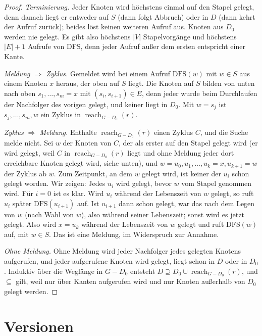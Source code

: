 \documentclass[a4paper,12pt,twoside]{report}
\DeclareRobustCommand{\_}{\ifmmode\mbox{\textunderscore}\else\textunderscore\allowbreak{}\fi}
\theoremstyle{definition}
\begin{document}
\begin{proof}
	\emph{Terminierung.} Jeder Knoten wird höchstens einmal auf den Stapel gelegt, denn danach liegt er entweder auf $S$ (dann folgt Abbruch) oder in $D$ (dann kehrt der Aufruf zurück); beides löst keinen weiteren Aufruf aus. Knoten aus $D_0$ werden nie gelegt. Es gibt also höchstens $|V|$ Stapelvorgänge und höchstens $|E|+1$ Aufrufe von DFS, denn jeder Aufruf außer dem ersten entspricht einer Kante.
 
	\emph{Meldung $\Rightarrow$ Zyklus.} Gemeldet wird bei einem Aufruf $\mathrm{DFS}(w)$ mit $w\in S$ aus einem Knoten $x$ heraus, der oben auf $S$ liegt. Die Knoten auf $S$ bilden von unten nach oben $s_1,\ldots,s_m=x$ mit $(s_i,s_{i+1})\in E$, denn jeder wurde beim Durchlaufen der Nachfolger des vorigen gelegt, und keiner liegt in $D_0$. Mit $w=s_j$ ist $s_j,\ldots,s_m,w$ ein Zyklus in $\operatorname{reach}_{G-D_0}(r)$.
 
	\emph{Zyklus $\Rightarrow$ Meldung.} Enthalte $\operatorname{reach}_{G-D_0}(r)$ einen Zyklus $C$, und die Suche melde nicht. Sei $w$ der Knoten von $C$, der als erster auf den Stapel gelegt wird (er wird gelegt, weil $C$ in $\operatorname{reach}_{G-D_0}(r)$ liegt und ohne Meldung jeder dort erreichbare Knoten gelegt wird, siehe unten), und $w=u_0,u_1,\ldots,u_k=x,u_{k+1}=w$ der Zyklus ab $w$. Zum Zeitpunkt, an dem $w$ gelegt wird, ist keiner der $u_i$ schon gelegt worden. Wir zeigen: Jedes $u_i$ wird gelegt, bevor $w$ vom Stapel genommen wird. Für $i=0$ ist es klar. Wird $u_i$ während der Lebenszeit von $w$ gelegt, so ruft $u_i$ später $\mathrm{DFS}(u_{i+1})$ auf. Ist $u_{i+1}$ dann schon gelegt, war das nach dem Legen von $w$ (nach Wahl von $w$), also während seiner Lebenszeit; sonst wird es jetzt gelegt. Also wird $x=u_k$ während der Lebenszeit von $w$ gelegt und ruft $\mathrm{DFS}(w)$ auf, mit $w\in S$. Das ist eine Meldung, im Widerspruch zur Annahme.
 
	\emph{Ohne Meldung.} Ohne Meldung wird jeder Nachfolger jedes gelegten Knotens aufgerufen, und jeder aufgerufene Knoten wird gelegt, liegt schon in $D$ oder in $D_0$. Induktiv über die Weglänge in $G-D_0$ entsteht $D\supseteq D_0\cup\operatorname{reach}_{G-D_0}(r)$, und $\subseteq$ gilt, weil nur über Kanten aufgerufen wird und nur Knoten außerhalb von $D_0$ gelegt werden.
\end{proof}
 
\section{Versionen}
\end{document}
